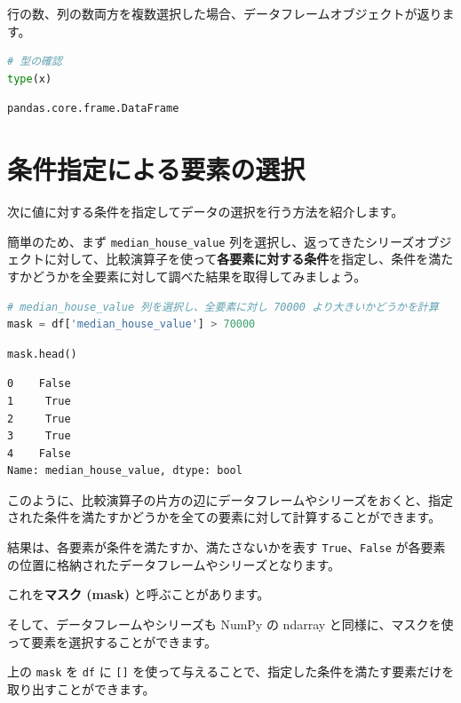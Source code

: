 行の数、列の数両方を複数選択した場合、データフレームオブジェクトが返ります。


\begin{lstlisting}[style=codecell,language=Python]
# 型の確認
type(x)
\end{lstlisting}

\begin{lstlisting}[style=outputcell]
pandas.core.frame.DataFrame
\end{lstlisting}

\section{条件指定による要素の選択}


次に値に対する条件を指定してデータの選択を行う方法を紹介します。


簡単のため、まず \texttt{median\_house\_value} 列を選択し、返ってきたシリーズオブジェクトに対して、比較演算子を使って\textbf{各要素に対する条件}を指定し、条件を満たすかどうかを全要素に対して調べた結果を取得してみましょう。


\begin{lstlisting}[style=codecell,language=Python]
# median_house_value 列を選択し、全要素に対し 70000 より大きいかどうかを計算
mask = df['median_house_value'] > 70000
\end{lstlisting}

\begin{lstlisting}[style=codecell,language=Python]
mask.head()
\end{lstlisting}

\begin{lstlisting}[style=outputcell]
0    False
1     True
2     True
3     True
4    False
Name: median_house_value, dtype: bool
\end{lstlisting}

このように、比較演算子の片方の辺にデータフレームやシリーズをおくと、指定された条件を満たすかどうかを全ての要素に対して計算することができます。

結果は、各要素が条件を満たすか、満たさないかを表す \texttt{True}、\texttt{False} が各要素の位置に格納されたデータフレームやシリーズとなります。

これを\textbf{マスク (mask)} と呼ぶことがあります。


そして、データフレームやシリーズも NumPy の ndarray と同様に、マスクを使って要素を選択することができます。

上の \texttt{mask} を \texttt{df} に \texttt{[]} を使って与えることで、指定した条件を満たす要素だけを取り出すことができます。


